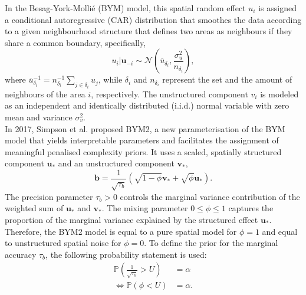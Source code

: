 In the Besag-York-Mollié (BYM\autocite[Cf.][]{besag1991bayesian}) model, this spatial random effect $u_i$ is assigned a conditional autoregressive (CAR) distribution that smoothes the data according to a given neighbourhood structure that defines two areas as neighbours if they share a common boundary, specifically,
\begin{equation}
    u_i|\pmb{u}_{-i}\sim\mathcal{N}\left(\overline{u}_{\delta_i}, \frac{\sigma_u^2}{n_{\delta_i}}\right),
\end{equation}
where $\overline{u}_{\delta_i}^{-1}=n_{\delta_i}^{-1}\sum_{j\in\delta_i} u_j$, while $\delta_i$ and $n_{\delta_i}$ represent the set and the amount of neighbours of the area $i$, respectively. The unstructured component $v_i$ is modeled as an independent and identically distributed (i.i.d.) normal variable with zero mean and variance $\sigma_v^2$. \\
In 2017, Simpson et al. proposed BYM2, a new parameterisation of the BYM model that yields interpretable parameters and facilitates the assignment of meaningful penalised complexity priors. It uses a scaled, spatially structured component $\pmb{u_*}$ and an unstructured component $\pmb{v_*}$,
\begin{equation}
    \pmb{b}=\frac{1}{\sqrt{\tau_b}}\left(\sqrt{1-\phi}\pmb{v_*}+\sqrt{\phi}\pmb{u_*}\right).
\end{equation}
The precision parameter $\tau_b > 0$ controls the marginal variance contribution of the weighted sum of $\pmb{u_*}$ and $\pmb{v_*}$. The mixing parameter $0\leq\phi\leq1$ captures the proportion of the marginal variance explained by the structured effect $\pmb{u}_*$. Therefore, the BYM2 model is equal to a pure spatial model for $\phi=1$ and equal to unstructured spatial noise for $\phi=0$. To define the prior for the marginal accuracy $\tau_b$, the following probability statement is used:
\begin{align}
    \mathbb{P}\left(\frac{1}{\sqrt{\tau_b}}>U\right)&=\alpha\nonumber\\
    \Longleftrightarrow\mathbb{P}\left(\phi <U\right)&=\alpha.
\end{align}

